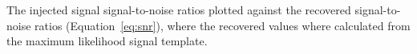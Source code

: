 \label{fig:snrplot}
The injected signal signal-to-noise ratios plotted against the recovered signal-to-noise ratios (Equation~\ref{eq:snr}),
where the recovered values where calculated from the maximum likelihood signal template.
